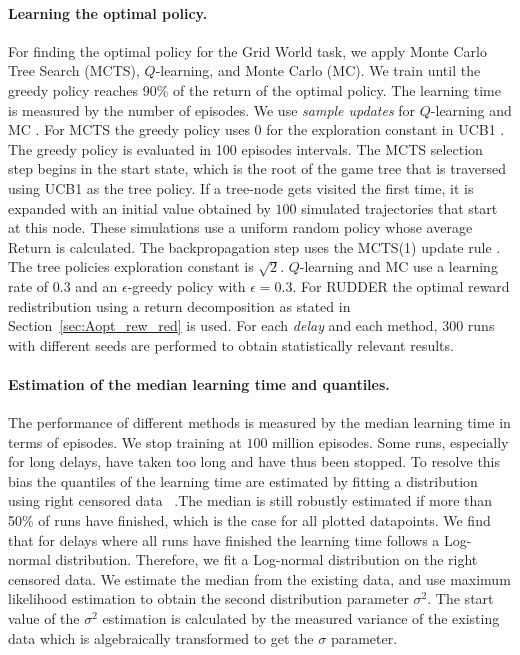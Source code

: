 \documentclass{article}
\begin{document}
\begin{appendices}
\paragraph{Learning the optimal policy.} 
For finding the optimal policy for the Grid World task, 
we apply Monte Carlo Tree Search (MCTS), 
$Q$-learning, and Monte Carlo (MC). 
We train until the greedy policy reaches 90\% of the return of the optimal policy. The learning time is measured by the number of episodes.
We use {\em sample updates} for $Q$-learning and MC \cite{Sutton:18book}. 
For MCTS the greedy policy uses $0$ for the exploration constant in UCB1 \cite{Kocsis:06}.
The greedy policy is evaluated in 100 episodes intervals. 
The MCTS selection step begins in the start state, 
which is the root of the game tree 
that is traversed using UCB1 \cite{Kocsis:06} as the tree policy. 
If a tree-node gets visited the first time, 
it is expanded with an initial value obtained by $100$ simulated trajectories that start at this node. 
These simulations use a uniform random policy whose average Return is calculated. 
The backpropagation step uses the MCTS(1) update rule \cite{Khandelwal:16}. 
The tree policies exploration constant is $\sqrt{2}$.
$Q$-learning and MC use a learning rate of $0.3$ and an 
$\epsilon$-greedy policy with $\epsilon=0.3$.
For RUDDER the optimal reward redistribution using 
a return decomposition as stated 
in Section~\ref{sec:Aopt_rew_red}
is used. For each {\em delay} and each method, 300 runs with different seeds are performed to obtain statistically relevant results.

\paragraph{Estimation of the median learning time and quantiles.}
\label{sec:Alr_estimation}
The performance of different methods is measured by 
the median learning time in terms of episodes.
We stop training at $100$ million episodes. 
Some runs, especially for long delays, have taken too long 
and have thus been stopped. To resolve this bias the quantiles of the 
learning time are estimated by fitting a distribution using right censored data~\cite{gijbels2010censored} .The median is still robustly estimated 
if more than 50\% of runs have finished, 
which is the case for all plotted datapoints.
We find that for delays where all runs have finished 
the learning time follows a Log-normal distribution. 
Therefore, we fit a Log-normal distribution on the right censored data. 
We estimate the median from the existing data, 
and use maximum likelihood estimation to obtain 
the second distribution parameter $\sigma^2$. 
The start value of the $\sigma^2$ estimation is calculated by 
the measured variance of the existing data 
which is algebraically transformed to get the $\sigma$ parameter.


\end{appendices}
\end{document}
